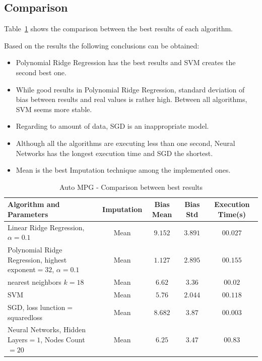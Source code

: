 \subsection{Comparison}
Table~\ref{table:db1-results} shows the comparison between the best results of each algorithm.

Based on the results the following conclusions can be obtained:
\begin{itemize}
  \item Polynomial Ridge Regression has the best results and SVM creates the second best one.
  \item While good results in Polynomial Ridge Regression, standard deviation of bias between results and real values is rather high. Between all algorithms, SVM seems more stable.
  \item Regarding to amount of data, SGD is an inappropriate model.
  \item Although all the algorithms are executing less than one second, Neural Networks has the longest execution time and SGD the shortest.
  \item Mean is the best Imputation technique among the implemented ones.
\end{itemize}

		\begin{table}
\begin{center}
\begin{tabular}{|p{4cm}|c|c|c|c|}
\hline Algorithm and Parameters & Imputation & Bias Mean & Bias Std & Execution Time(s)\\

\hline Linear Ridge Regression, $\alpha=0.1$ & Mean & $9.152$ & $3.891$ & $00.027$ \\

\hline Polynomial Ridge Regression, highest exponent$=32$, $\alpha=0.1$ & Mean & $\mathbf{1.127}$ & $2.895$ & $00.155$  \\

\hline nearest neighbors $k=18$ & Mean & $6.62$ & $3.36$ & $00.02$  \\

\hline SVM & Mean & $5.76$ & $\mathbf{2.044}$ & $00.118$  \\

\hline SGD, loss lunction$=$squaredloss & Mean & $8.682$ & $3.87$ & $\mathbf{00.003}$  \\

\hline Neural Networks, Hidden Layers$=1$, Nodes Count$=20$ & Mean & $6.25$ & $3.47$ & $00.83$  \\

\hline
\end{tabular}
    \caption{Auto MPG - Comparison between best results}
    \label{table:db1-results}
\end{center}
    \end{table}


